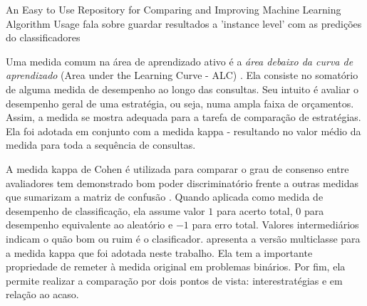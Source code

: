 An Easy to Use Repository for Comparing and Improving Machine Learning Algorithm Usage
fala sobre guardar resultados a 'instance level' com as predições do classificadores



 Uma medida comum na área de aprendizado ativo
 é a \textit{área debaixo da curva de aprendizado} (Area under the Learning Curve - ALC)
 \citep{journals/jmlr/GuyonCDL11}.
 Ela consiste no somatório de alguma medida de desempenho ao longo
 das consultas.
 Seu intuito é avaliar o desempenho geral de uma estratégia, ou seja,
 numa ampla faixa de orçamentos.
 Assim, a medida se mostra adequada para a tarefa de comparação
 de estratégias.
 Ela foi adotada em conjunto com a medida kappa -
 resultando no valor médio da medida para toda a sequência de consultas.

A medida kappa de Cohen \citep{journals/coling/EugenioG04}
é utilizada para comparar o grau de consenso entre avaliadores
tem demonstrado bom poder discriminatório frente a outras medidas
que sumarizam a matriz de confusão \citep{conf/acivs/DemirkesenC08}.
Quando aplicada como medida de desempenho de classificação,
ela assume valor $1$ para acerto total, $0$ para desempenho equivalente ao
aleatório e $-1$ para erro total.
Valores intermediários indicam o quão bom ou ruim é o clasificador.
\cite{conf/pkdd/Shah11} apresenta a versão multiclasse para a medida kappa
que foi adotada neste trabalho.
Ela tem a importante propriedade de remeter à medida original em problemas binários.
Por fim, ela permite realizar a comparação por dois pontos de vista:
interestratégias e em relação ao acaso.

